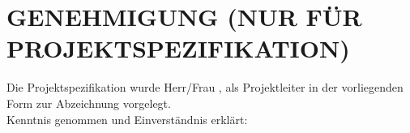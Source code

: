 \thispagestyle{empty}

\section*{GENEHMIGUNG (NUR FÜR PROJEKTSPEZIFIKATION)}
Die Projektspezifikation wurde Herr/Frau \companyprojectleader, \companyname als Projektleiter in der vorliegenden Form zur Abzeichnung vorgelegt.\\[0.5em]
Kenntnis genommen und Einverständnis erklärt:

\vspace*{4em}
\begin{flushleft}
	\makebox[.4\textwidth]{\hrulefill}\hfill \makebox[.4\textwidth]{\hrulefill}\\
	\makebox[.4\textwidth]{\SCMTdatetime}\hfill
	\\
\end{flushleft}
\vspace*{4em}
\begin{flushleft}
	\makebox[.4\textwidth]{\hrulefill}\hfill \makebox[.4\textwidth]{\hrulefill}\\
	\makebox[.4\textwidth]{\SCMTdatetime}\hfill
	\\
\end{flushleft}
\vspace*{4em}
\begin{flushleft}
	\makebox[.4\textwidth]{\hrulefill}\hfill \makebox[.4\textwidth]{\hrulefill}\\
	\makebox[.4\textwidth]{\SCMTdatetime}\hfill
	\\
\end{flushleft}


